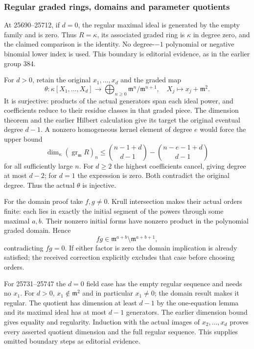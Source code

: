 \subsubsection{Regular graded rings, domains and parameter quotients}\label{regular-graded-rings-domains-and-parameter-quotients}

At 25690--25712, if \(d=0\), the regular maximal ideal is generated by the empty family and is zero. Thus \(R=\kappa\), its associated graded ring is \(\kappa\) in degree zero, and the claimed comparison is the identity. No degree-\(-1\) polynomial or negative binomial lower index is used. This boundary is editorial evidence, as in the earlier group 384.

For \(d>0\), retain the original \(x_1,\ldots,x_d\) and the graded map \[
 \theta:\kappa[X_1,\ldots,X_d]\longrightarrow
 \bigoplus_{n\ge0}\mathfrak m^n/\mathfrak m^{n+1},\quad
 X_j\longmapsto x_j+\mathfrak m^2.
\] It is surjective: products of the actual generators span each ideal power, and coefficients reduce to their residue classes in that graded piece. The dimension theorem and the earlier Hilbert calculation give its target the original eventual degree \(d-1\). A nonzero homogeneous kernel element of degree \(e\) would force the upper bound \[
 \dim_\kappa(\operatorname{gr}_{\mathfrak m}R)_n
 \le {n-1+d\choose d-1}-{n-e-1+d\choose d-1}
\] for all sufficiently large \(n\). For \(d\ge2\) the highest coefficients cancel, giving degree at most \(d-2\); for \(d=1\) the expression is zero. Both contradict the original degree. Thus the actual \(\theta\) is injective.

For the domain proof take \(f,g\ne0\). Krull intersection makes their actual orders finite: each lies in exactly the initial segment of the powers through some maximal \(a,b\). Their nonzero initial forms have nonzero product in the polynomial graded domain. Hence \[
 fg\in\mathfrak m^{a+b}\setminus\mathfrak m^{a+b+1},
\] contradicting \(fg=0\). If either factor is zero the domain implication is already satisfied; the received correction explicitly excludes that case before choosing orders.

For 25731--25747 the \(d=0\) field case has the empty regular sequence and needs no \(x_1\). For \(d>0\), \(x_1\notin\mathfrak m^2\) and in particular \(x_1\ne0\); the domain result makes it regular. The quotient has dimension at least \(d-1\) by the one-equation lemma and its maximal ideal has at most \(d-1\) generators. The earlier dimension bound gives equality and regularity. Induction with the actual images of \(x_2,\ldots,x_d\) proves every asserted quotient dimension and the full regular sequence. This supplies omitted boundary steps as editorial evidence.

